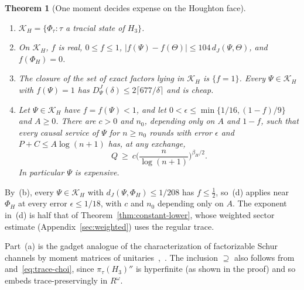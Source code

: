 \documentclass[11pt,a4paper]{article}
\theoremstyle{plain}
\newtheorem{theorem}{Theorem}[section]
\theoremstyle{definition}
\theoremstyle{remark}
\newcommand{\DChoi}{D^{J}}
\newcommand{\dJ}{d_J}
\begin{document}
\begin{theorem}[One moment decides expense on the Houghton face]\label{thm:face}
\leavevmode
\begin{enumerate}[label=(\alph*)]
\item $\mathcal K_H=\{\Phi_\tau:\tau$ a tracial state of $H_3\}$.
\item On $\mathcal K_H$, $f$ is real, $0\le f\le1$, $|f(\Psi)-f(\Theta)|\le104\,\dJ(\Psi,\Theta)$, and $f(\Phi_H)=0$.
\item The closure of the set of exact factors lying in $\mathcal K_H$ is $\{f=1\}$. Every $\Psi\in\mathcal K_H$ with $f(\Psi)=1$ has
$\DChoi_\Psi(\delta)\le2\lceil677/\delta\rceil$ and is cheap.
\item Let $\Psi\in\mathcal K_H$ have $f=f(\Psi)<1$, and let $0<\epsilon\le\min\{1/16,(1-f)/9\}$ and $A\ge0$. There are $c>0$ and $n_0$, depending only
on $A$ and $1-f$, such that every causal service of $\Psi$ for $n\ge n_0$ rounds with error $\epsilon$ and $P+C\le A\log(n+1)$ has, at any exchange,
\[
Q\ \ge\ c\Big(\frac n{\log(n+1)}\Big)^{\beta_H/2}.
\]
In particular $\Psi$ is expensive.
\end{enumerate}
\end{theorem}

By~(b), every $\Psi\in\mathcal K_H$ with $\dJ(\Psi,\Phi_H)\le1/208$ has $f\le\frac12$, so~(d) applies near $\Phi_H$ at every error $\epsilon\le1/18$, with $c$ and $n_0$ depending only on $A$. The exponent in~(d) is half that of Theorem~\ref{thm:constant-lower}, whose weighted sector estimate
(Appendix~\ref{sec:weighted}) uses the regular trace.

Part~(a) is the gadget analogue of the characterization of factorizable Schur channels by moment matrices of
unitaries~\cite[Proposition~2.8]{HaagerupMusat2011},~\cite[Proposition~3.9]{Musat2025}. The inclusion $\supseteq$ also follows
from~\cite[Theorem~3.6]{HaagerupMusat2015} and~\eqref{eq:trace-choi}, since $\pi_\tau(H_3)''$ is hyperfinite (as shown in the proof) and so embeds
trace-preservingly in $R^\omega$.
\end{document}
